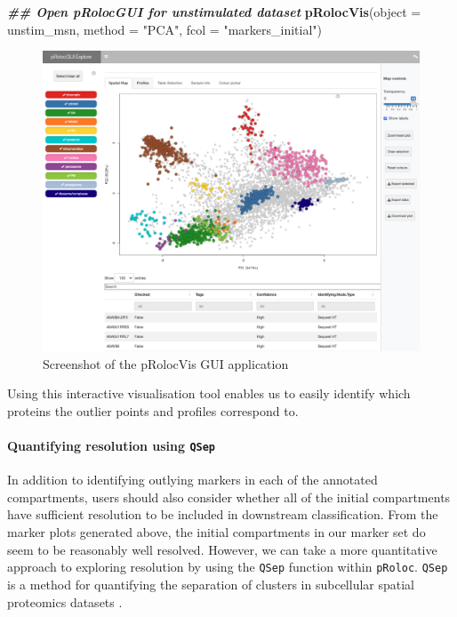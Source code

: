\documentclass[9pt,a4paper,]{extarticle}
\newenvironment{Shaded}{\begin{snugshade}}{\end{snugshade}}
\newcommand{\AttributeTok}[1]{\textcolor[rgb]{0.13,0.29,0.53}{#1}}
\newcommand{\DocumentationTok}[1]{\textcolor[rgb]{0.56,0.35,0.01}{\textbf{\textit{#1}}}}
\newcommand{\FunctionTok}[1]{\textcolor[rgb]{0.13,0.29,0.53}{\textbf{#1}}}
\newcommand{\NormalTok}[1]{#1}
\newcommand{\StringTok}[1]{\textcolor[rgb]{0.31,0.60,0.02}{#1}}
\begin{document}
\begin{Shaded}
\begin{Highlighting}[]
\DocumentationTok{\#\# Open pRolocGUI for unstimulated dataset}
\FunctionTok{pRolocVis}\NormalTok{(}\AttributeTok{object =}\NormalTok{ unstim\_msn, }
          \AttributeTok{method =} \StringTok{"PCA"}\NormalTok{, }
          \AttributeTok{fcol =} \StringTok{"markers\_initial"}\NormalTok{)}
\end{Highlighting}
\end{Shaded}

\begin{figure}[H]

{\centering \includegraphics[width=0.8\linewidth,]{figs/pRolocVis_screenshot} 

}

\caption{Screenshot of the pRolocVis GUI application}\label{fig:pRolocvis-picture}
\end{figure}

Using this interactive visualisation tool enables us to easily identify which
proteins the outlier points and profiles correspond to.

\paragraph{\texorpdfstring{Quantifying resolution using \texttt{QSep}}{Quantifying resolution using QSep}}\label{quantifying-resolution-using-qsep}

In addition to identifying outlying markers in each of the annotated
compartments, users should also consider whether all of the initial compartments
have sufficient resolution to be included in downstream classification. From
the marker plots generated above, the initial compartments in our marker set do
seem to be reasonably well resolved. However, we can take a more quantitative
approach to exploring resolution by using the \texttt{QSep} function within \texttt{pRoloc}.
\texttt{QSep} is a method for quantifying the separation of clusters in subcellular spatial
proteomics datasets \citep{Gatto2019}.
\end{document}
